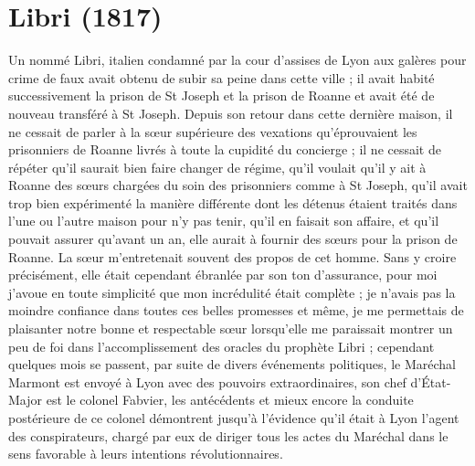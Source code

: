\documentclass[11pt,a4paper]{report}
\begin{document}
\section*{Libri (1817)}

Un nommé Libri, italien condamné par la cour d'assises de Lyon aux galères pour crime de faux avait obtenu de subir sa peine dans cette ville ; il avait habité successivement la prison de St Joseph et la prison de Roanne et avait été de nouveau transféré à St Joseph. Depuis son retour dans cette dernière maison, il ne cessait de parler à la sœur supérieure des vexations qu'éprouvaient les prisonniers de Roanne livrés à toute la cupidité du concierge ; il ne cessait de répéter qu'il saurait bien faire changer de régime, qu'il voulait qu'il y ait à Roanne des sœurs chargées du soin des prisonniers comme à St Joseph, qu'il avait trop bien expérimenté la manière différente dont les détenus étaient traités dans l'une ou l'autre maison pour n'y pas tenir, qu'il en faisait son affaire, et qu'il pouvait assurer qu'avant un an, elle aurait à fournir des sœurs pour la prison de Roanne. La sœur m'entretenait souvent des propos de cet homme. Sans y croire précisément, elle était cependant ébranlée par son ton d'assurance, pour moi j'avoue en toute simplicité que mon incrédulité était complète ; je n'avais pas la moindre confiance dans toutes ces belles promesses et même, je me permettais de plaisanter notre bonne et respectable sœur lorsqu'elle me paraissait montrer un peu de foi dans l'accomplissement des oracles du prophète Libri ; cependant quelques mois se passent, par suite de divers événements politiques, le Maréchal Marmont est envoyé à Lyon avec des pouvoirs extraordinaires, son chef d'État-Major est le colonel Fabvier, les antécédents et mieux encore la conduite postérieure de ce colonel démontrent jusqu'à l'évidence qu'il était à Lyon l'agent des conspirateurs, chargé par eux de diriger tous les actes du Maréchal dans le sens favorable à leurs intentions révolutionnaires.
\end{document}
